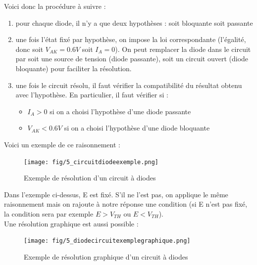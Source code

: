 \documentclass[a4paper]{article}
\begin{document}
    Voici donc la procédure à suivre :
    \begin{enumerate}
        \item pour chaque diode, il n'y a que deux hypothèses : soit bloquante soit passante
        \item une fois l'état fixé par hypothèse, on impose la loi correspondante (l'égalité, 
        donc soit $V_{AK} = 0.6V$ soit $I_A=0$). On peut remplacer la diode
        dans le circuit par soit une source de tension (diode passante), soit
        un circuit ouvert (diode bloquante) pour faciliter la résolution.
        \item une fois le circuit résolu, il faut vérifier la compatibilité
        du résultat obtenu avec l'hypothèse. En particulier, il faut vérifier si :
        \begin{itemize}
            \item $I_A >0$ si on a choisi l'hypothèse d'une diode passante
            \item $V_{AK} < 0.6V$ si on a choisi l'hypothèse d'une diode bloquante
        \end{itemize}
    \end{enumerate}

    Voici un exemple de ce raisonnement :
    \begin{figure}[H]
        \begin{center}
            \texttt{[image: fig/5\_circuitdiodeexemple.png]}
            \caption{Exemple de résolution d'un circuit à diodes}
            \label{fig:5_circuitdiodeexemple}
        \end{center}
    \end{figure}

    Dans l'exemple ci-dessus, E est fixé. S'il ne l'est pas, on applique le 
    même raisonnement mais on rajoute à notre réponse une condition (si E
    n'est pas fixé, la condition sera par exemple $E > V_{TH}$ ou $E < V_{TH}$).\\

    Une résolution graphique est aussi possible :
    \begin{figure}[H]
        \begin{center}
            \texttt{[image: fig/5\_diodecircuitexemplegraphique.png]}
            \caption{Exemple de résolution graphique d'un circuit à diodes}
            \label{fig:5_diodecircuitexemplegraphique}
        \end{center}
    \end{figure}
\end{document}
